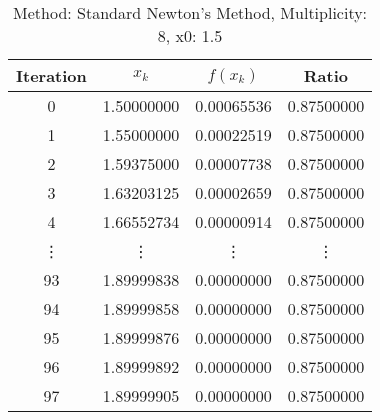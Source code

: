\begin{table}
\centering
\caption{Method: Standard Newton's Method, Multiplicity: 8, x0: 1.5}
\label{tab:table_Standard_Newton's_Method_8_1_5}
\begin{tabular}{c c c c}
\toprule
Iteration &      $x_k$ &   $f(x_k)$ &      Ratio \\
\midrule
        0 & 1.50000000 & 0.00065536 & 0.87500000 \\
        1 & 1.55000000 & 0.00022519 & 0.87500000 \\
        2 & 1.59375000 & 0.00007738 & 0.87500000 \\
        3 & 1.63203125 & 0.00002659 & 0.87500000 \\
        4 & 1.66552734 & 0.00000914 & 0.87500000 \\
   \vdots &     \vdots &     \vdots &     \vdots \\
       93 & 1.89999838 & 0.00000000 & 0.87500000 \\
       94 & 1.89999858 & 0.00000000 & 0.87500000 \\
       95 & 1.89999876 & 0.00000000 & 0.87500000 \\
       96 & 1.89999892 & 0.00000000 & 0.87500000 \\
       97 & 1.89999905 & 0.00000000 & 0.87500000 \\
\bottomrule
\end{tabular}
\end{table}
